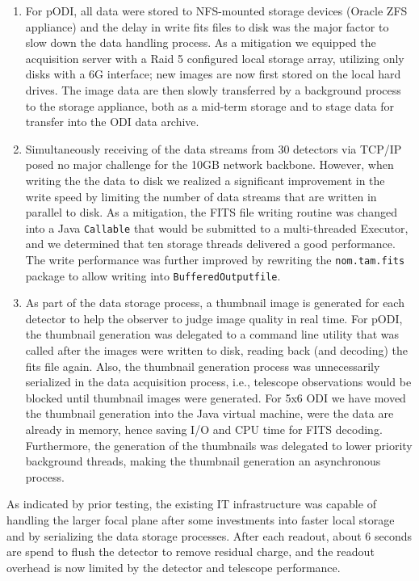 \documentclass[]{spieman}
\begin{document}
\begin{enumerate} 
    
\item For pODI, all data were stored to NFS-mounted storage devices (Oracle ZFS
appliance) and the delay in  write fits files to disk was the major factor to
slow down the data handling process. As a mitigation we equipped the acquisition
server with a Raid 5 configured local storage array, utilizing only disks with a
6G interface; new images are now first stored on the local hard drives. The
image data are then slowly transferred by a background process to the storage
appliance, both as a mid-term storage and to stage data for transfer into the
ODI data archive.

\item   Simultaneously receiving of the data streams from 30 detectors via
TCP/IP posed no major challenge for the 10GB network backbone.  However, when
writing the the data to disk we realized a significant  improvement in the write
speed by limiting the number of data streams that are written in parallel to
disk. As a mitigation, the FITS file writing routine was changed into a Java
{\tt Callable} that would be submitted to a multi-threaded Executor, and we
determined that ten storage threads delivered a good performance. The write
performance was further improved by rewriting the {\tt nom.tam.fits} package to
allow writing into {\tt BufferedOutputfile}.

\item As part of the data storage process, a thumbnail image is generated for
each detector to help the observer to judge image quality in real time. For
pODI, the thumbnail generation was delegated to a command line utility that was
called after the images were written to disk, reading back (and decoding) the
fits file again. Also, the thumbnail generation process was unnecessarily
serialized in the data acquisition process, i.e., telescope observations would
be blocked until thumbnail images were generated.  For 5x6 ODI we have moved the
thumbnail generation into the Java virtual machine, were the data are already in
memory, hence saving I/O and CPU time for FITS decoding. Furthermore, the
generation of the thumbnails was delegated to  lower priority background
threads, making the thumbnail generation an asynchronous process.

    
\end{enumerate}

As indicated by prior testing, the existing IT infrastructure was capable of
handling the larger focal plane after some investments into faster local
storage and by serializing the data storage  processes.  After each readout, about 6 seconds
are spend to flush the detector to remove residual charge, and the readout
overhead is now limited by the detector and telescope performance.
\end{document}

